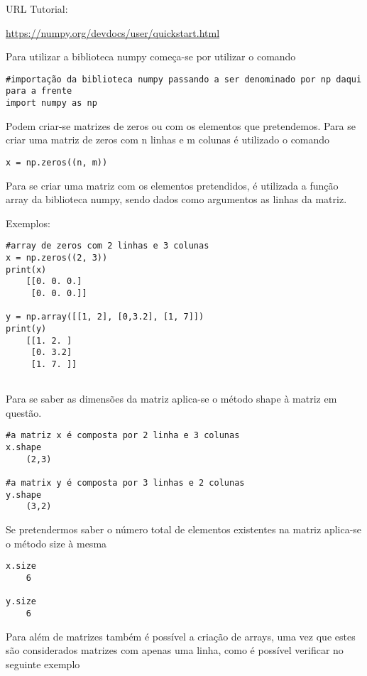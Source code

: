 \documentclass{article}
\begin{document}
URL Tutorial:

\url{https://numpy.org/devdocs/user/quickstart.html}

Para utilizar a biblioteca numpy começa-se por utilizar o comando

\begin{lstlisting}
#importação da biblioteca numpy passando a ser denominado por np daqui para a frente
import numpy as np
\end{lstlisting}

Podem criar-se matrizes de zeros ou com os elementos que pretendemos. Para se criar uma matriz de zeros com n linhas e m colunas \'e utilizado o comando 

\begin{lstlisting}
x = np.zeros((n, m))
\end{lstlisting}

Para se criar uma matriz com os elementos pretendidos, \'e utilizada a fun\c c\~ao array da biblioteca numpy, sendo dados como argumentos as linhas da matriz.

Exemplos:

\begin{lstlisting}
#array de zeros com 2 linhas e 3 colunas
x = np.zeros((2, 3))
print(x)
	[[0. 0. 0.]
	 [0. 0. 0.]]

y = np.array([[1, 2], [0,3.2], [1, 7]])
print(y)
	[[1. 2. ]
	 [0. 3.2]
	 [1. 7. ]]
	 
\end{lstlisting}

Para se saber as dimens\~oes da matriz aplica-se o m\'etodo shape \`a matriz em quest\~ao.

\begin{lstlisting}
#a matriz x é composta por 2 linha e 3 colunas
x.shape
	(2,3)

#a matrix y é composta por 3 linhas e 2 colunas	
y.shape
	(3,2)
\end{lstlisting}

Se pretendermos saber o n\'umero total de elementos existentes na matriz aplica-se o m\'etodo size \`a mesma

\begin{lstlisting}
x.size
	6

y.size
	6
\end{lstlisting}

Para al\'em de matrizes tamb\'em \'e poss\'ivel a cria\c c\~ao de arrays, uma vez que estes s\~ao considerados matrizes com apenas uma linha, como \'e poss\'ivel verificar no seguinte exemplo
\end{document}
